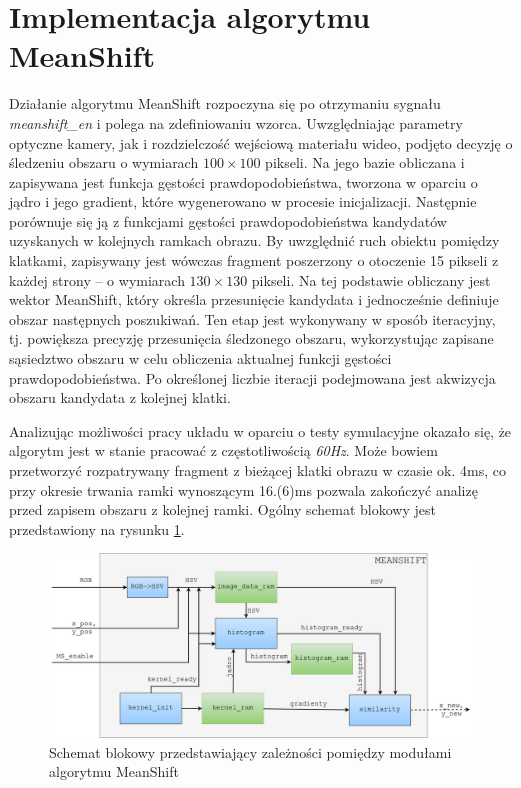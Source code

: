  
\section{Implementacja algorytmu MeanShift}

Działanie algorytmu MeanShift rozpoczyna się po otrzymaniu sygnału \textit{meanshift\_en} i polega na zdefiniowaniu wzorca. Uwzględniając parametry optyczne kamery, jak i rozdzielczość wejściową materiału wideo, podjęto decyzję o śledzeniu obszaru o wymiarach $100 \times 100$ pikseli.
Na jego bazie obliczana i zapisywana jest funkcja gęstości prawdopodobieństwa, tworzona w oparciu o jądro i jego gradient, które wygenerowano w procesie inicjalizacji. 
Następnie porównuje się ją z funkcjami gęstości prawdopodobieństwa kandydatów uzyskanych w kolejnych ramkach obrazu. By uwzględnić ruch obiektu pomiędzy klatkami, zapisywany jest wówczas fragment poszerzony o otoczenie 15 pikseli z każdej strony -- o wymiarach $130 \times 130$ pikseli. 
Na tej podstawie obliczany jest wektor MeanShift, który określa przesunięcie kandydata i jednocześnie definiuje obszar następnych poszukiwań.
Ten etap jest wykonywany w sposób iteracyjny, tj. powiększa precyzję przesunięcia śledzonego obszaru, wykorzystując zapisane sąsiedztwo obszaru w celu obliczenia aktualnej funkcji gęstości prawdopodobieństwa. 
Po określonej liczbie iteracji podejmowana jest akwizycja obszaru kandydata z kolejnej klatki.

Analizując możliwości pracy układu w oparciu o testy symulacyjne okazało się, że algorytm jest w stanie pracować z częstotliwością \textit{60Hz}. Może bowiem przetworzyć rozpatrywany fragment z bieżącej klatki obrazu w czasie ok. 4ms, co przy okresie trwania ramki wynoszącym 16.(6)ms  pozwala zakończyć analizę przed zapisem obszaru z kolejnej ramki.  
Ogólny schemat blokowy jest przedstawiony na rysunku \ref{fig:MS_scheme_FPGA}.
\begin{figure}[h]
	\centering
	\includegraphics[width=16cm]{Meanshift.png}
	\captionsetup{justification=centering,margin=1cm}
	\caption{Schemat blokowy przedstawiający zależności pomiędzy modułami algorytmu MeanShift}
	\label{fig:MS_scheme_FPGA}
\end{figure}



